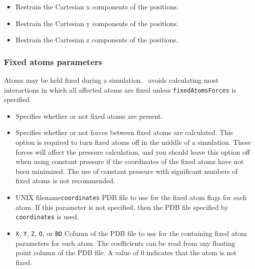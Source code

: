 \begin{itemize}
\item
{}
{Restrain the Cartesian x components of the positions.}
\item
{}
{Restrain the Cartesian y components of the positions.}
\item
{}
{Restrain the Cartesian z components of the positions.}

\end{itemize}

\subsubsection{Fixed atoms parameters}

Atoms may be held fixed during a simulation.  \NAMD\ avoids calculating most interactions in which all affected atoms are fixed unless {\tt fixedAtomsForces} is specified.

\begin{itemize}

\item
{}
{Specifies whether or not fixed atoms are present.} 

\item
{}
{Specifies whether or not forces between fixed atoms are calculated.  This option is required to turn fixed atoms off in the middle of a simulation.
These forces will affect the pressure calculation, and you should leave this option off when using constant pressure if the coordinates of the fixed atoms have not been minimized.
The use of constant pressure with significant numbers of fixed atoms is not recommended.}

\item
{}
{UNIX filename}{{\tt coordinates}}
{PDB file to use for the fixed atom flags for each atom.  
If this parameter is not specified, then 
the PDB file specified by {\tt coordinates} is used.}

\item
{}
{{\tt X}, {\tt Y}, {\tt Z}, {\tt O}, or {\tt B}}{{\tt O}} 
{Column of the PDB file to use for the containing fixed atom parameters for 
each atom.  The coefficients can be read from any 
floating point column of the PDB file.  
A value of 0 indicates that the atom is not fixed.}

\end{itemize}

